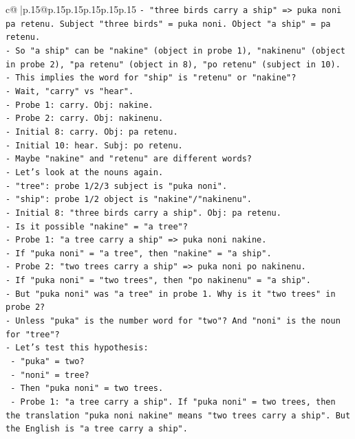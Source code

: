 \documentclass{article}
\begin{document}
{\begin{supertabular}{c@{$\;$}|p{.15\linewidth}@{}p{.15\linewidth}p{.15\linewidth}p{.15\linewidth}p{.15\linewidth}p{.15\linewidth}}
{{{\texttt{{-} "three birds carry a ship" => puka noni pa retenu. Subject "three birds" = puka noni. Object "a ship" = pa retenu.} \\
\texttt{{-} So "a ship" can be "nakine" (object in probe 1), "nakinenu" (object in probe 2), "pa retenu" (object in 8), "po retenu" (subject in 10).} \\
\texttt{{-} This implies the word for "ship" is "retenu" or "nakine"?} \\
\texttt{{-} Wait, "carry" vs "hear".} \\
\texttt{{-} Probe 1: carry. Obj: nakine.} \\
\texttt{{-} Probe 2: carry. Obj: nakinenu.} \\
\texttt{{-} Initial 8: carry. Obj: pa retenu.} \\
\texttt{{-} Initial 10: hear. Subj: po retenu.} \\
\texttt{{-} Maybe "nakine" and "retenu" are different words?} \\
\texttt{{-} Let's look at the nouns again.} \\
\texttt{{-} "tree": probe 1/2/3 subject is "puka noni".} \\
\texttt{{-} "ship": probe 1/2 object is "nakine"/"nakinenu".} \\
\texttt{{-} Initial 8: "three birds carry a ship". Obj: pa retenu.} \\
\texttt{{-} Is it possible "nakine" = "a tree"?} \\
\texttt{{-} Probe 1: "a tree carry a ship" => puka noni nakine.} \\
\texttt{{-} If "puka noni" = "a tree", then "nakine" = "a ship".} \\
\texttt{{-} Probe 2: "two trees carry a ship" => puka noni po nakinenu.} \\
\texttt{{-} If "puka noni" = "two trees", then "po nakinenu" = "a ship".} \\
\texttt{{-} But "puka noni" was "a tree" in probe 1. Why is it "two trees" in probe 2?} \\
\texttt{{-} Unless "puka" is the number word for "two"? And "noni" is the noun for "tree"?} \\
\texttt{{-} Let's test this hypothesis:} \\
\texttt{  {-} "puka" = two?} \\
\texttt{  {-} "noni" = tree?} \\
\texttt{  {-} Then "puka noni" = two trees.} \\
\texttt{  {-} Probe 1: "a tree carry a ship". If "puka noni" = two trees, then the translation "puka noni nakine" means "two trees carry a ship". But the English is "a tree carry a ship".} \\
}}}
\end{supertabular}}
\end{document}
